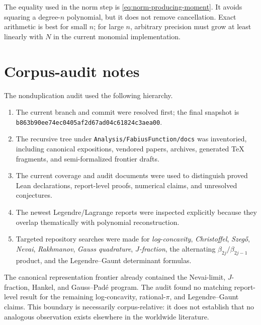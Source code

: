 \documentclass[11pt,oneside]{article}
\theoremstyle{definition}
\theoremstyle{remark}
\numberwithin{equation}{section}
\newcommand{\repo}{\nolinkurl{Analysis/FabiusFunction/docs}}
\newcommand{\commit}{\nolinkurl{b863b90ee74ec0405af2d67ad04c61824c3aea00}}
\begin{document}
The equality used in the norm step is
\cref{eq:norm-producing-moment}.  It avoids squaring a degree-$n$ polynomial,
but it does not remove cancellation.  Exact arithmetic is best for small $n$;
for large $n$, arbitrary precision must grow at least linearly with $N$ in the
current monomial implementation.

\section{Corpus-audit notes}
\label{app:corpus-audit}

The nonduplication audit used the following hierarchy.
\begin{enumerate}
\item The current branch and commit were resolved first; the final snapshot is
      \commit{}.
\item The recursive tree under \repo{} was inventoried, including canonical
      expositions, vendored papers, archives, generated TeX fragments, and
      semi-formalized frontier drafts.
\item The current coverage and audit documents were used to distinguish proved
      Lean declarations, report-level proofs, numerical claims, and unresolved
      conjectures.
\item The newest Legendre/Lagrange reports were inspected explicitly because
      they overlap thematically with polynomial reconstruction.
\item Targeted repository searches were made for
      \emph{log-concavity}, \emph{Christoffel}, \emph{Szeg\H{o}},
      \emph{Nevai}, \emph{Rakhmanov}, \emph{Gauss quadrature},
      \emph{$J$-fraction}, the alternating $\beta_{2j}/\beta_{2j-1}$ product,
      and the Legendre--Gaunt determinant formulas.
\end{enumerate}
The canonical representation frontier already contained the Nevai-limit,
$J$-fraction, Hankel, and Gauss--Pad\'e program.  The audit found no matching
report-level result for the remaining log-concavity, rational-$\pi$, and
Legendre--Gaunt claims.  This boundary is necessarily corpus-relative: it does
not establish that no analogous observation exists elsewhere in the worldwide
literature.
\end{document}
